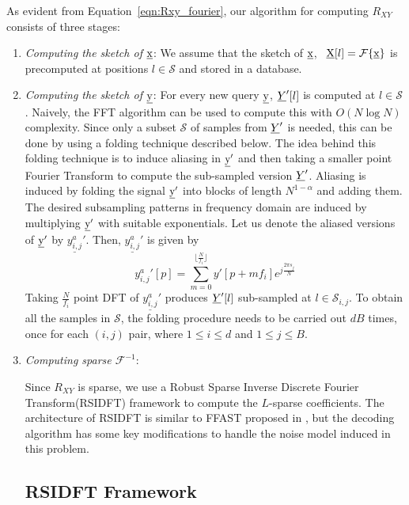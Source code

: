  As evident from Equation~\ref{eqn:Rxy_fourier}, our algorithm for computing $R_{XY}$ consists of three stages:
\begin{enumerate}
	\item[\RNum{1}] \textit{Computing the sketch of $\underline{\mathrm{x}}$}: 
	 We assume that the sketch of $\underline{\mathrm{x}}$, \ $ \underline{\mathrm{X}}[l] = \mathcal{F}\{\underline{\mathrm{x}}\}$ is precomputed at positions $l \in \mathcal{S}$ and stored in a database.  
	\item[\RNum{2}] \textit{Computing the sketch of $\underline{\mathrm{y}}$}:
	 For every new query $\underline{\mathrm{y}}$, $ \underline{Y}'[l]$ is computed at $l \in \mathcal{S}$. Naively, the FFT algorithm can be used to compute this with $O(N \log N)$ complexity. Since only a subset $\mathcal{S}$ of samples from $\underline{Y}'$ is needed, this can be done by using a folding technique described below. 
	  The idea behind this folding technique is to induce aliasing in $\underline{\mathrm{y}}'$ and then taking a smaller point Fourier Transform to compute the sub-sampled version $\underline{Y}'$. Aliasing is induced by folding the signal $\underline{\mathrm{y}}'$ into blocks of length $N^{1-\alpha}$ and adding them. The desired subsampling patterns in frequency domain are induced by multiplying $\underline{\mathrm{y}}'$ with suitable exponentials. Let us denote the aliased versions of $\underline{\mathrm{y}}'$ by $\underline{y^{a}_{i,j}}'$. Then, $\underline{y^{a}_{i,j}}'$ is given by
	  \begin{equation}
	  	{y^{a}_{i,j}}'[p] = \sum \limits_{m = 0}^{\lfloor{\frac{N}{f_i}}\rfloor} y'[p + mf_i] e^{j \frac{2 \pi s_j}{N} } 
	  \end{equation}
	  Taking $\frac{N}{f_i}$ point DFT of $\underline{y^{a}_{i,j}}'$ produces $\underline{Y}'[l]$ sub-sampled at $l \in \mathcal{S}_{i,j}$. To obtain all the samples in $\mathcal{S}$, the folding procedure needs to be carried out $dB$ times, once for each $(i,j)$ pair, where $1 \leq i \leq d $ and  $1 \leq j \leq B $.  
	       
	\item[\RNum{3}] \textit{Computing sparse $\mathcal{F}^{-1}$}: 
	
	 Since $R_{XY}$ is sparse, we use a Robust Sparse Inverse  Discrete Fourier Transform(RSIDFT) framework to compute the $L$-sparse coefficients. The architecture of RSIDFT is similar to FFAST proposed in \cite{pawar2014robust}, but the decoding algorithm has some key modifications to handle the noise model induced in this problem.
	 
	 
	 \subsection{RSIDFT Framework} 	\label{sec:RSIDFT}
	

\end{enumerate}
